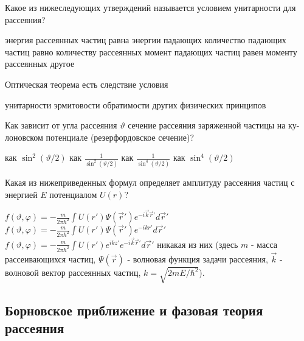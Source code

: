 \documentclass[11pt,a4paper]{exam}
\begin{document}
\begin{questions}
\question Какое из нижеследующих утверждений называется условием унитарности для рассеяния?
\begin{choices}
\choice энергия рассеянных частиц равна энергии падающих
\choice количество падающих частиц равно количеству рассеянных
\choice момент падающих частиц равен моменту рассеянных
\choice другое 
\end{choices}

\question Оптическая теорема есть следствие условия
\begin{choices}
\choice унитарности    
\choice эрмитовости    
\choice обратимости 
\choice других физических принципов
\end{choices}

\question Как зависит от угла рассеяния $\vartheta $ сечение рассеяния заряженной частицы на ку-лоновском потенциале (резерфордовское сечение)?
\begin{choices}
\choice как ${\sin ^2}(\vartheta /2)$ 
\choice как $\frac{1}{{{{\sin }^2}(\vartheta /2)}}$  
\choice как $\frac{1}{{{{\sin }^4}(\vartheta /2)}}$  
\choice как ${\sin ^4}(\vartheta /2)$
\end{choices}

\question Какая из нижеприведенных формул определяет амплитуду рассеяния частиц с энергией $E$ потенциалом $U(r)$?
\begin{choices}
\choice $f(\vartheta ,\varphi ) =  - \frac{m}{{2\pi {\hbar ^2}}}\int {U(r')\Psi (\vec r'){e^{ - i\vec k\vec r'}}d\vec r'} $      
\choice $f(\vartheta ,\varphi ) =  - \frac{m}{{2\pi {\hbar ^2}}}\int {U(r')\Psi (\vec r'){e^{ - ikr'}}d\vec r'} $
\choice $f(\vartheta ,\varphi ) =  - \frac{m}{{2\pi {\hbar ^2}}}\int {U(r'){e^{ikz'}}{e^{ - i\vec k\vec r'}}d\vec r'} $    
\choice никакая из них
(здесь $m$ - масса рассеивающихся частиц, $\Psi (\vec r)$ - волновая функция задачи рассеяния, $\vec k$ - волновой вектор рассеянных частиц, $k = \sqrt {2mE/{\hbar ^2}} $).
\end{choices}

\end{questions}

\subsection{ Борновское приближение и фазовая теория рассеяния }
\end{document}
